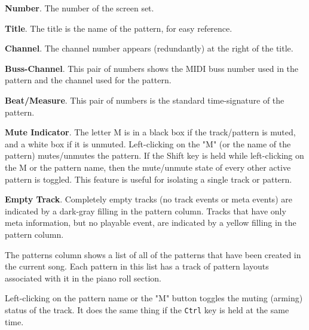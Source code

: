    \begin{enumber}
      \item \textbf{Number}.
         The number of the screen set.
      \item \textbf{Title}.
         The title is the name of the pattern, for easy reference.
      \item \textbf{Channel}.
         The channel number appears (redundantly)
         at the right of the title.
      \item \textbf{Buss-Channel}.
         This pair of numbers shows the MIDI buss number used in the pattern
         and the channel used for the pattern.
      \item \textbf{Beat/Measure}.
         This pair of numbers is the standard time-signature of the pattern.
      \item \textbf{Mute Indicator}.
         The letter M is in a black box if the track/pattern is muted, and a
         white box if it is unmuted.
         Left-clicking on the "M" (or the name of the pattern)
         mutes/unmutes the pattern.
         If the Shift key is held while left-clicking on the M or the pattern
         name, then
         the mute/unmute state of every other active pattern is toggled.
         This feature is useful for isolating a single track or pattern.
      \item \textbf{Empty Track}.
         Completely empty tracks (no track events or meta events)
         are indicated by a dark-gray filling in the pattern column.
         Tracks that have only meta information, but no playable event, are
         indicated by a yellow filling in the pattern column.
   \end{enumber}

   The patterns column shows a list of all of the patterns that have been
   created in the current song.  Each pattern in this list has a track of
   pattern layouts associated with it in the piano roll section.

   Left-clicking on the pattern name or the "M" button toggles the muting
   (arming) status of the track.
   It does the same thing if the \texttt{Ctrl} key is held at the same time.

